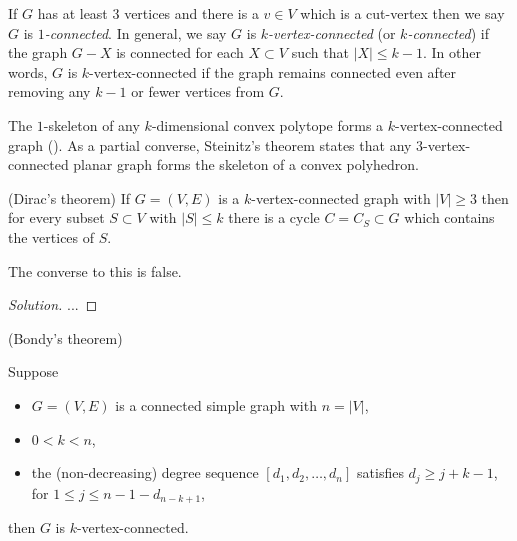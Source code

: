 If $G$ has at least $3$ vertices and there is a $v\in V$
which is a cut-vertex then we say $G$ is {\it $1$-connected}.
 In general, we say $G$ is {\it $k$-vertex-connected} (or
{\it $k$-connected})
if the graph $G-X$ is connected for each $X\subset V$
such that $|X|\leq k-1$.
In other words, $G$ is $k$-vertex-connected
if the graph remains connected even after removing
any $k-1$ or fewer vertices from $G$.

\begin{example}
The $1$-skeleton of any $k$-dimensional convex polytope forms
a $k$-vertex-connected graph
(\cite{Balinski1961}). As a partial converse, Steinitz's theorem
states that any $3$-vertex-connected planar graph forms
the skeleton of a convex polyhedron.

\end{example}


\begin{theorem}
(Dirac's theorem)
{\rm
If $G=(V,E)$ is a $k$-vertex-connected graph with
$|V|\geq 3$ then for every subset $S\subset V$ with
$|S|\leq k$ there is a cycle $C=C_S\subset G$ which contains
the vertices of $S$.
}
\end{theorem}

The converse to this is false.

\begin{proof}[Solution]
...
\end{proof}


\begin{theorem}
(Bondy's theorem)
{\rm
Suppose

\begin{itemize}
\item
$G=(V,E)$ is a connected simple graph with $n=|V|$,
\item
$0<k<n$,
\item
the (non-decreasing) degree sequence
$[d_1,d_2,\dots, d_n]$ satisfies
$d_j\geq j+k-1$, for $1\leq j\leq n-1-d_{n-k+1}$,
\end{itemize}
then $G$ is $k$-vertex-connected.
}
\end{theorem}

